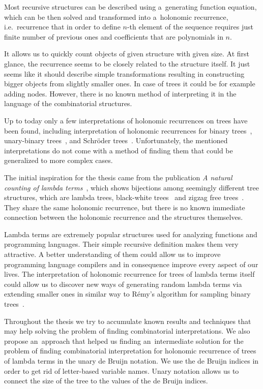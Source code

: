 \documentclass[final]{article}
\theoremstyle{definition}
\theoremstyle{definition}
\theoremstyle{remark}
\begin{document}
Most recursive structures can be described using a~generating function equation, which can be then solved and transformed into a~holonomic recurrence, i.e.~recurrence that in order to define \(n\)-th element of the sequence requires just finite number of previous ones and coefficients that are polynomials in \(n\).

It allows us to quickly count objects of given structure with given size. At first glance, the recurrence seems to be closely related to the structure itself. It just seems like it should describe simple transformations resulting in constructing bigger objects from slightly smaller ones. In case of trees it could be for example adding nodes. However, there is no known method of interpreting it in the language of the combinatorial structures.

Up to today only a few interpretations of holonomic recurrences on trees have been found, including interpretation of holonomic recurrences for binary trees~\cite{binary}, unary-binary trees~\cite{motzkin}, and Schröder trees~\cite{schroder}. Unfortunately, the mentioned interpretations do not come with a method of finding them that could be generalized to more complex cases.

The initial inspiration for the thesis came from the publication \textit{A natural counting of lambda terms}~\cite{inspiration}, which shows bijections among seemingly different tree structures, which are lambda trees, black-white trees~\cite{blackwhite} and zigzag free trees~\cite{inspiration}. They share the same holonomic recurrence, but there is no known immediate connection between the holonomic recurrence and the structures themselves.

Lambda terms are extremely popular structures used for analyzing functions and programming languages. Their simple recursive definition makes them very attractive. A better understanding of them could allow us to improve programming language compilers and in consequence improve every aspect of our lives. The interpretation of holonomic recurrence for trees of lambda terms itself could allow us to discover new ways of generating random lambda terms via extending smaller ones in similar way to Rémy's algorithm for sampling binary trees~\cite{remy,note}.

Throughout the thesis we try to accumulate known results and techniques that may help solving the problem of finding combinatorial interpretations. We also propose an~approach that helped us finding an~intermediate solution for the problem of finding combinatorial interpretation for holonomic recurrence of trees of lambda terms in the unary de Bruijn notation. We use the de Bruijn indices in order to get rid of letter-based variable names. Unary notation allows us to connect the size of the tree to the values of the de Bruijn indices.
\end{document}
